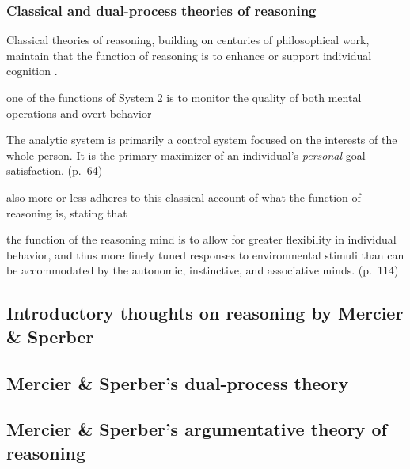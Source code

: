 \subsubsection{Classical and dual-process theories of reasoning}

Classical theories of reasoning, building on centuries of philosophical work, maintain that the function of reasoning is to enhance or support individual cognition \citep{MS11}.

\begin{quoting}
    one of the functions of System 2 is to monitor the quality of both mental operations and overt behavior
    \hfill \citep[p.~699]{Kahneman03}
\end{quoting}

\begin{quoting}
    The analytic system is primarily a control system focused on the interests of the whole person. It is the primary maximizer of an individual's \emph{personal} goal satisfaction.
    (p.~64)
\end{quoting}

\citet{Goel22} also more or less adheres to this classical account of what the function of reasoning is, stating that
\begin{quoting}
    the function of the reasoning mind is to allow for greater flexibility in individual behavior, and thus more finely tuned responses to environmental stimuli than can be accommodated by the autonomic, instinctive, and associative minds.
    \hfill (p.~114)
\end{quoting}

\subsection{Introductory thoughts on reasoning by Mercier \& Sperber}

\subsection{Mercier \& Sperber's dual-process theory}

\subsection{Mercier \& Sperber's argumentative theory of reasoning}
\label{sec:exp-atr}

